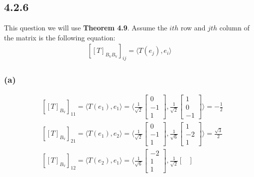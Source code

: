\documentclass{article}
\begin{document}
\subsection*{4.2.6}
\noindent This question we will use \textbf{Theorem 4.9}. Assume the $ith$ row and $jth$ column of the matrix is the following equation: 
\begin{equation*}
    \begin{split}
        [[T]_{B_{\mathbb{V}}B_{\mathbb{V}}}]_{ij} = \langle T(e_j), e_i \rangle
    \end{split}
\end{equation*}

\subsubsection*{(a)}
\begin{equation*}
    \begin{split}
        &[[T]_{B_\mathbb{V}}]_{11} = \langle T(e_1), e_1 \rangle = \langle \frac{1}{\sqrt{2}} \begin{bmatrix}
            0 \\ -1 \\ 1
        \end{bmatrix}, \frac{1}{\sqrt{2}}\begin{bmatrix}
            1 \\ 0 \\ -1
        \end{bmatrix} \rangle = - \frac{1}{2}\\
        &[[T]_{B_\mathbb{V}}]_{21} = \langle T(e_1), e_2 \rangle =  \langle \frac{1}{\sqrt{2}} \begin{bmatrix}
            0 \\ -1 \\ 1
        \end{bmatrix}, \frac{1}{\sqrt{6}}\begin{bmatrix}
            1 \\ -2 \\ 1
        \end{bmatrix} \rangle = \frac{\sqrt{3}}{2}\\
        &[[T]_{B_\mathbb{V}}]_{12} = \langle T(e_2), e_1 \rangle =  \langle \frac{1}{\sqrt{6}} \begin{bmatrix}
            -2 \\ 1 \\ 1
        \end{bmatrix}, \frac{1}{\sqrt{2}}\begin{bmatrix}

\end{bmatrix}
\end{split}
\end{equation*}
\end{document}
